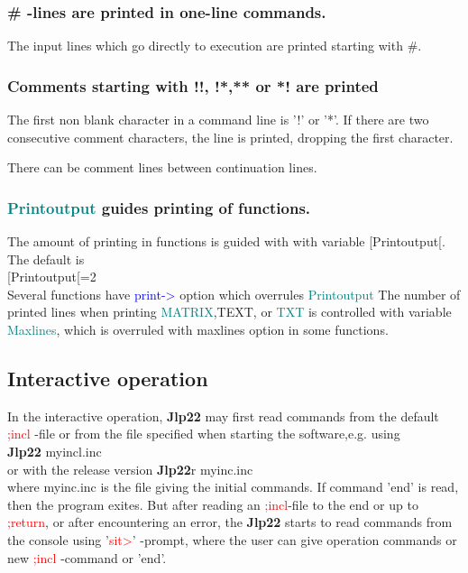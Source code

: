 {\begin{itemize}
\begin{itemize}
\subsubsection{\# -lines are printed in one-line commands.} 
\label{printcommand} 
The input lines which go directly to execution are printed starting with \#. 
\subsubsection{Comments starting with !!, !*,** or *! are printed} 
\label{printcom} 
The first non blank character in a command line is '!' or '*'. 
If there are two consecutive comment characters, the line is printed, dropping the first 
character. 
\begin{note} 
There can be comment lines between continuation lines. 
\end{note} 
\subsubsection{\textcolor{teal}{Printoutput} guides printing of functions.} 
\label{printoutput} 
The amount of printing in functions is guided with with variable [Printoutput[. 
The default is \\ 
[Printoutput[=2\\ 
Several functions have \textcolor{blue}{print->} option which overrules \textcolor{teal}{Printoutput} 
The number of printed lines when printing \textcolor{teal}{MATRIX},TEXT, or \textcolor{teal}{TXT} is controlled with 
variable \textcolor{teal}{Maxlines}, which is overruled with maxlines option in some functions. 
\subsection{Interactive operation} 
\label{interactive} 
In the interactive operation, \textbf{Jlp22} may first read commands from the 
default \textcolor{Red}{;incl} -file or from the file specified when starting the software,e.g. using\\ 
\textbf{Jlp22} myincl.inc \\ 
or with the release version 
\textbf{Jlp22}r myinc.inc\\ 
where myinc.inc is the file giving the initial commands. If command 'end' is read, then the program exites. 
But after reading an \textcolor{Red}{;incl}-file to the end or up to \textcolor{Red}{;return}, or after encountering an error, the \textbf{Jlp22} starts 
to read commands from the console using '\textcolor{Red}{sit>}' -prompt, where the user can give 
operation commands or new \textcolor{Red}{;incl} -command or 'end'. 
 

\end{itemize}
\end{itemize}}
